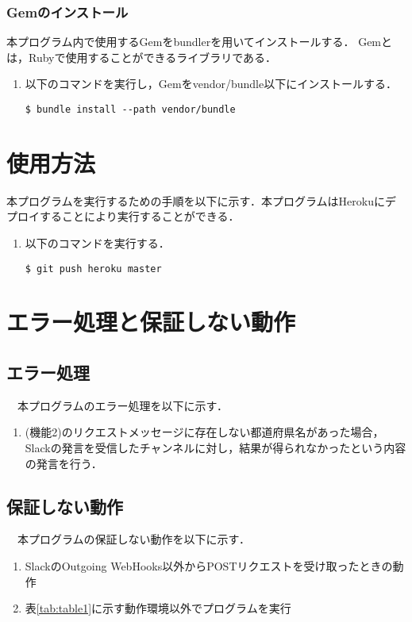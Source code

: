 \documentclass[fleqn, 14pt]{extarticlej}
\begin{document}
\subsubsection{Gemのインストール}
本プログラム内で使用するGemをbundlerを用いてインストールする．
Gemとは，Rubyで使用することができるライブラリである．
\begin{enumerate}
\item 以下のコマンドを実行し，Gemをvendor/bundle以下にインストールする．
\begin{verbatim}
$ bundle install --path vendor/bundle
\end{verbatim}
\end{enumerate}
\section{使用方法}
\label{使用方法}
本プログラムを実行するための手順を以下に示す．本プログラムはHerokuにデプロイすることにより実行することができる．
\begin{enumerate}
\item 以下のコマンドを実行する．
\begin{verbatim}
$ git push heroku master
\end{verbatim}
\end{enumerate}

\section{エラー処理と保証しない動作}
\label{エラー処理と保証しない動作}
\subsection{エラー処理}
　本プログラムのエラー処理を以下に示す．
\begin{enumerate}
\item (機能2)のリクエストメッセージに存在しない都道府県名があった場合，Slackの発言を受信したチャンネルに対し，結果が得られなかったという内容の発言を行う．

\end{enumerate}
\subsection{保証しない動作}
　本プログラムの保証しない動作を以下に示す．
\begin{enumerate}
\item SlackのOutgoing WebHooks以外からPOSTリクエストを受け取ったときの動作
\item 表\ref{tab:table1}に示す動作環境以外でプログラムを実行
\end{enumerate}



\end{document}
